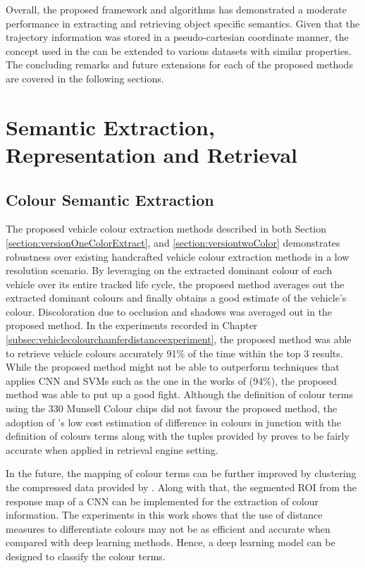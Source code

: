 Overall, the proposed framework and algorithms has demonstrated a moderate performance in extracting and retrieving object specific semantics. Given that the trajectory information was stored in a pseudo-cartesian coordinate manner, the concept used in the \versionTwoRet can be extended to various datasets with similar properties. The concluding remarks and future extensions for each of the proposed methods are covered in the following sections.

\section*{Semantic Extraction, Representation and Retrieval}

\subsection*{Colour Semantic Extraction}
The proposed vehicle colour extraction methods described in both Section \ref{section:versionOneColorExtract}, and \ref{section:versiontwoColor} demonstrates robustness over existing handcrafted vehicle colour extraction methods in a low resolution scenario. 
By leveraging on the extracted dominant colour of each vehicle over its entire tracked life cycle, the proposed method averages out the extracted dominant colours and finally obtains a good estimate of the vehicle's colour. Discoloration due to occlusion and shadows was averaged out in the proposed method. 
In the experiments recorded in Chapter \ref{subsec:vehiclecolourchamferdistanceexperiment}, the proposed method was able to retrieve vehicle colours accurately 91\% of the time within the top 3 results.  
While the proposed method might not be able to outperform techniques that applies CNN and SVMs such as the one in the works of \cite{hu2015vehicle} (94\%), the proposed method was able to put up a good fight. 
Although the definition of colour terms using the 330 Munsell Colour chips did not favour the proposed method, the adoption of \cite{riemersma}'s low cost estimation of difference in colours in junction with the definition of colours terms along with the tuples provided by \cite{munroe2010color} proves to be fairly accurate when applied in retrieval engine setting.     

In the future, the mapping of colour terms can be further improved by clustering the compressed data provided by . Along with that, the segmented ROI from the response map of a CNN can be implemented for the extraction of colour information. The experiments in this work shows that the use of distance measures to differentiate colours may not be as efficient and accurate when compared with deep learning methods. Hence, a deep learning model can be designed to classify the colour terms.


